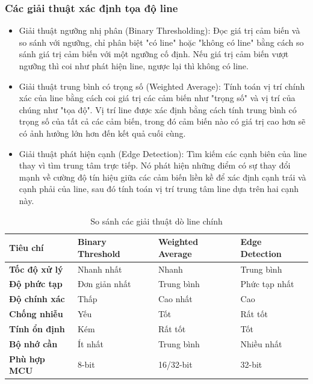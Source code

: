             \subsubsection{Các giải thuật xác định tọa độ line}
                \begin{itemize}
                    \item Giải thuật ngưỡng nhị phân (Binary Thresholding):
                        Đọc giá trị cảm biến và so sánh với ngưỡng, chỉ phân biệt "có line" hoặc "không có line" bằng cách so sánh giá trị cảm biến với một ngưỡng cố định. Nếu giá trị cảm biến vượt ngưỡng thì coi như phát hiện line, ngược lại thì không có line. 
                    \item Giải thuật trung bình có trọng số (Weighted Average):
                        Tính toán vị trí chính xác của line bằng cách coi giá trị các cảm biến như "trọng số" và vị trí của chúng như "tọa độ". Vị trí line được xác định bằng cách tính trung bình có trọng số của tất cả các cảm biến, trong đó cảm biến nào có giá trị cao hơn sẽ có ảnh hưởng lớn hơn đến kết quả cuối cùng.
                    \item Giải thuật phát hiện cạnh (Edge Detection):
                        Tìm kiếm các cạnh biên của line thay vì tìm trung tâm trực tiếp. Nó phát hiện những điểm có sự thay đổi mạnh về cường độ tín hiệu giữa các cảm biến liền kề để xác định cạnh trái và cạnh phải của line, sau đó tính toán vị trí trung tâm line dựa trên hai cạnh này.
                \end{itemize}
                \begin{table}[H]
                    \centering
                    \caption{So sánh các giải thuật dò line chính}
                    \begin{tabular}{|p{3cm}|p{3.75cm}|p{3.75cm}|p{3.75cm}|}
                        \hline
                        \textbf{Tiêu chí} & \textbf{Binary Threshold} & \textbf{Weighted Average} & \textbf{Edge Detection} \\
                        \hline
                        \textbf{Tốc độ xử lý} & Nhanh nhất & Nhanh & Trung bình \\
                        \hline
                        \textbf{Độ phức tạp} & Đơn giản nhất & Trung bình & Phức tạp nhất \\
                        \hline
                        \textbf{Độ chính xác} & Thấp & Cao nhất & Cao \\
                        \hline
                        \textbf{Chống nhiễu} & Yếu & Tốt & Rất tốt \\
                        \hline
                        \textbf{Tính ổn định} & Kém & Rất tốt & Tốt \\
                        \hline
                        \textbf{Bộ nhớ cần} & Ít nhất & Trung bình & Nhiều nhất \\
                        \hline
                        \textbf{Phù hợp MCU} & 8-bit & 16/32-bit & 32-bit \\
                        \hline
                    \end{tabular}
                    \label{tab:comparison}
                \end{table}
